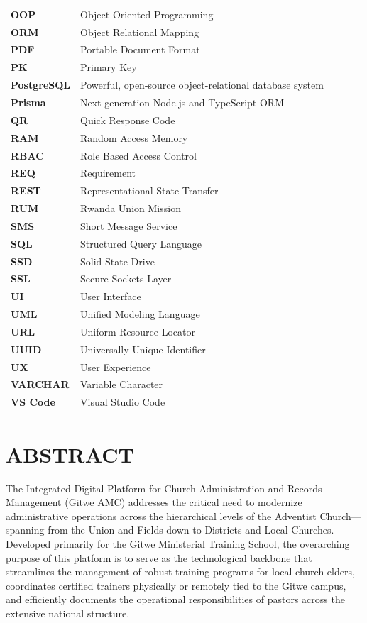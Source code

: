 \documentclass[12pt]{report}
\begin{document}
\begin{longtable}{L{3cm} L{12cm}}
\textbf{OOP} & Object Oriented Programming \\
\textbf{ORM} & Object Relational Mapping \\
\textbf{PDF} & Portable Document Format \\
\textbf{PK} & Primary Key \\
\textbf{PostgreSQL} & Powerful, open-source object-relational database system \\
\textbf{Prisma} & Next-generation Node.js and TypeScript ORM \\
\textbf{QR} & Quick Response Code \\
\textbf{RAM} & Random Access Memory \\
\textbf{RBAC} & Role Based Access Control \\
\textbf{REQ} & Requirement \\
\textbf{REST} & Representational State Transfer \\
\textbf{RUM} & Rwanda Union Mission \\
\textbf{SMS} & Short Message Service \\
\textbf{SQL} & Structured Query Language \\
\textbf{SSD} & Solid State Drive \\
\textbf{SSL} & Secure Sockets Layer \\
\textbf{UI} & User Interface \\
\textbf{UML} & Unified Modeling Language \\
\textbf{URL} & Uniform Resource Locator \\
\textbf{UUID} & Universally Unique Identifier \\
\textbf{UX} & User Experience \\
\textbf{VARCHAR} & Variable Character \\
\textbf{VS Code} & Visual Studio Code \\
\end{longtable}
\newpage

\section*{ABSTRACT}

The Integrated Digital Platform for Church Administration and Records Management (Gitwe AMC) addresses the critical need to modernize administrative operations across the hierarchical levels of the Adventist Church—spanning from the Union and Fields down to Districts and Local Churches. Developed primarily for the Gitwe Ministerial Training School, the overarching purpose of this platform is to serve as the technological backbone that streamlines the management of robust training programs for local church elders, coordinates certified trainers physically or remotely tied to the Gitwe campus, and efficiently documents the operational responsibilities of pastors across the extensive national structure.
\end{document}
